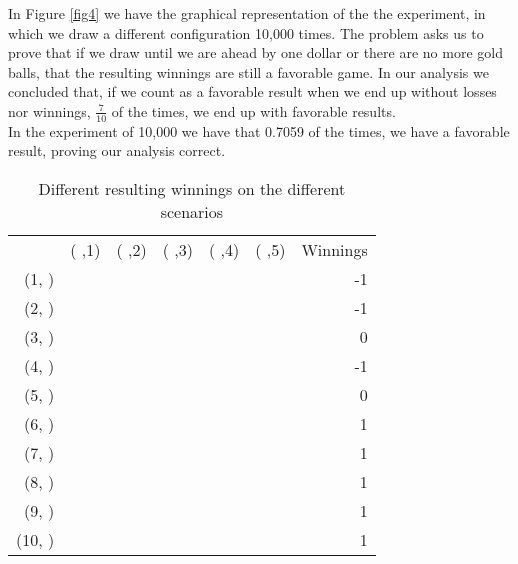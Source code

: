 \documentclass{article}
\begin{document}
In Figure \ref{fig4} we have the graphical representation of the the experiment, in which we draw a different configuration 10,000 times. The problem asks us to prove that if we draw until we are ahead by one dollar or there are no more gold balls, that the resulting winnings are still a favorable game. In our analysis we concluded that, if we count as a favorable result when we end up without losses nor winnings, $\frac{7}{10}$ of the times, we end up with favorable results. \\

In the experiment of 10,000 we have that 0.7059 of the times, we have a favorable result, proving our analysis correct.\\
 
 \begin{table}[]\caption{Different resulting winnings on the different scenarios}\label{tb4}
\centering
\begin{tabular}{ r  r  r  r  r  r  r  }
 &( ,1) & ( ,2) &( ,3) &( ,4) &( ,5) & Winnings \\
(1, )  & \textbf{\color{gray}{-1}} & \textbf{\color{gray}{-1}} &\textbf{\color{gray}{-1}} &\textbf{\color{goldenrod}{1}} & \textbf{\color{goldenrod}{1}}& -1\\
(2, )& \textbf{\color{gray}{-1}} & \textbf{\color{gray}{-1}} &\textbf{\color{goldenrod}{1}} & \textbf{\color{gray}{-1}} & \textbf{\color{goldenrod}{1}}& -1\\
(3, ) &  \textbf{\color{gray}{-1}}&  \textbf{\color{gray}{-1}}&\textbf{\color{goldenrod}{1}} & \textbf{\color{goldenrod}{1}}& \textbf{\color{gray}{-1}}& 0\\
(4, ) & \textbf{\color{gray}{-1}} & \textbf{\color{goldenrod}{1}} & \textbf{\color{gray}{-1}}& \textbf{\color{gray}{-1}}& \textbf{\color{goldenrod}{1}}& -1\\
(5, ) & \textbf{\color{gray}{-1}} &  \textbf{\color{goldenrod}{1}}& \textbf{\color{gray}{-1}} &\textbf{\color{goldenrod}{1}} & \textbf{\color{gray}{-1}}& 0\\
(6, ) & \textbf{\color{gray}{-1}} & \textbf{\color{goldenrod}{1}} & \textbf{\color{goldenrod}{1}}& \textbf{\color{gray}{-1}}& \textbf{\color{gray}{-1}}& 1\\
(7, ) & \textbf{\color{goldenrod}{1}} & \textbf{\color{gray}{-1}} &\textbf{\color{gray}{-1}} &\textbf{\color{gray}{-1}} & \textbf{\color{goldenrod}{1}}& 1\\
(8, ) &  \textbf{\color{goldenrod}{1}}& \textbf{\color{gray}{-1}} &\textbf{\color{gray}{-1}} & \textbf{\color{goldenrod}{1}}& \textbf{\color{gray}{-1}}& 1\\
(9, )& \textbf{\color{goldenrod}{1}} &  \textbf{\color{gray}{-1}}&\textbf{\color{goldenrod}{1}} & \textbf{\color{gray}{-1}}& \textbf{\color{gray}{-1}}& 1\\
(10, ) & \textbf{\color{goldenrod}{1}} & \textbf{\color{goldenrod}{1}} & \textbf{\color{gray}{-1}}& \textbf{\color{gray}{-1}}&\textbf{\color{gray}{-1}} &1 \\
\end{tabular}
\end{table}
\end{document}
